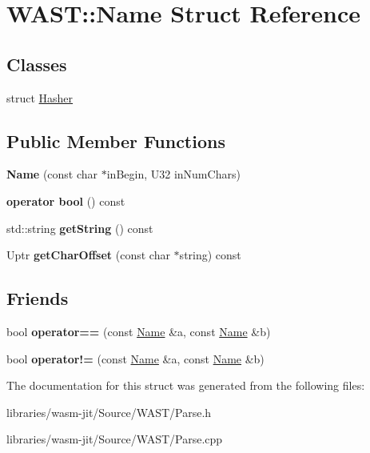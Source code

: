 \hypertarget{struct_w_a_s_t_1_1_name}{}\section{W\+A\+ST\+:\+:Name Struct Reference}
\label{struct_w_a_s_t_1_1_name}
\subsection*{Classes}
\begin{DoxyCompactItemize}
\item 
struct \mbox{\hyperlink{struct_w_a_s_t_1_1_name_1_1_hasher}{Hasher}}
\end{DoxyCompactItemize}
\subsection*{Public Member Functions}
\begin{DoxyCompactItemize}
\item 
\mbox{\label{struct_w_a_s_t_1_1_name_a68f2457abeaacbfe8588a8b06f57ecbc}} 
{\bfseries Name} (const char $\ast$in\+Begin, U32 in\+Num\+Chars)
\item 
\mbox{\label{struct_w_a_s_t_1_1_name_a6994b941937a146252c3655fbc60b8b4}} 
{\bfseries operator bool} () const
\item 
\mbox{\label{struct_w_a_s_t_1_1_name_acaddef876eb6fe1caf5c67998c3cc9b1}} 
std\+::string {\bfseries get\+String} () const
\item 
\mbox{\label{struct_w_a_s_t_1_1_name_ab3c55e55bf620d048145d0215389ac1e}} 
Uptr {\bfseries get\+Char\+Offset} (const char $\ast$string) const
\end{DoxyCompactItemize}
\subsection*{Friends}
\begin{DoxyCompactItemize}
\item 
\mbox{\label{struct_w_a_s_t_1_1_name_a32df73b17ea53322340af95b243e2cb6}} 
bool {\bfseries operator==} (const \mbox{\hyperlink{struct_w_a_s_t_1_1_name}{Name}} \&a, const \mbox{\hyperlink{struct_w_a_s_t_1_1_name}{Name}} \&b)
\item 
\mbox{\label{struct_w_a_s_t_1_1_name_a3fbfda14e91c2c3076d73d5411034800}} 
bool {\bfseries operator!=} (const \mbox{\hyperlink{struct_w_a_s_t_1_1_name}{Name}} \&a, const \mbox{\hyperlink{struct_w_a_s_t_1_1_name}{Name}} \&b)
\end{DoxyCompactItemize}


The documentation for this struct was generated from the following files\+:\begin{DoxyCompactItemize}
\item 
libraries/wasm-\/jit/\+Source/\+W\+A\+S\+T/Parse.\+h\item 
libraries/wasm-\/jit/\+Source/\+W\+A\+S\+T/Parse.\+cpp\end{DoxyCompactItemize}
